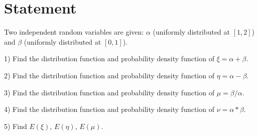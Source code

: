 \section*{Statement}

Two independent random variables are given: $\alpha$
(uniformly distributed at $[1, 2]$) and $\beta$ (uniformly
distributed at $[0, 1]$).

1) Find the distribution function and probability density function of $\xi = \alpha + \beta$.

2) Find the distribution function and probability density function of $\eta = \alpha - \beta$.

3) Find the distribution function and probability density function of $\mu = \beta / \alpha$.

4) Find the distribution function and probability density function of $\nu = \alpha * \beta$.

5) Find $E(\xi)$, $E(\eta)$, $E(\mu)$.